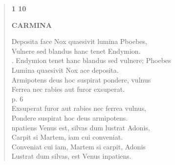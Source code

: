 \documentclass[11pt, a4paper]{report}
\begin{document}
\begin{verse}
    \begin{center} \textbf{1 10} \end{center}\begin{center} \textbf{CARMINA} \end{center}Deposita face Nox quaesivit lumina Pboebes, \\ Vulnere sed blandus hanc tenet Endymion. \\ . Endymion tenet hanc blandus sed vulnere; Phoebes \\ Lumina quaesivit Nox ace deposita. \\ Armipotens deus hoc suspirat pondere, vulnus \\ Ferrea nec rabies aut furor exsuperat. \\ p. 6 \\ Exsuperat furor aut rabies nec ferrea vulnus, \\ Pondere suspirat hoc deus armipotens. \\ npatiens Venus est, silvas dum lustrat Adonis, \\ Carpit si Martem, iam cui conveniat. \\ Conveniat cui iam, Martem si carpit, Adonis \\ Lustrat dum silvas, est Venus inpatiens. \\ 
      \end{verse}
  
\end{document}
